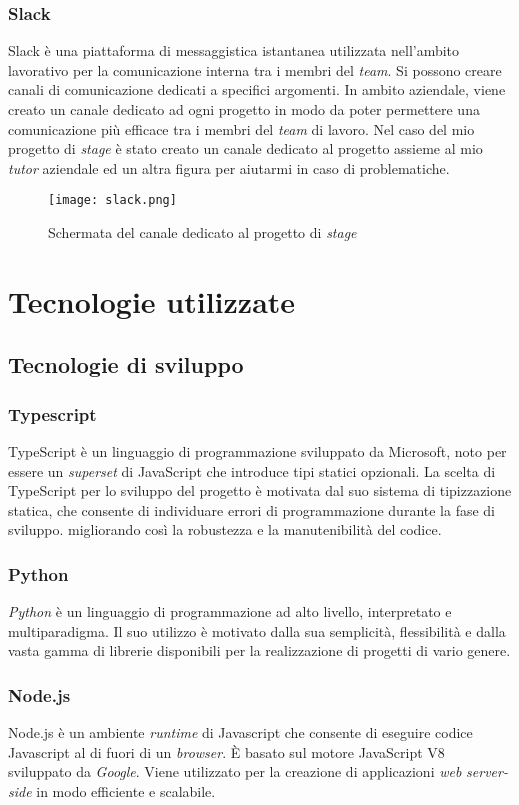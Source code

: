 \subsubsection{Slack}
Slack è una piattaforma di messaggistica istantanea utilizzata nell'ambito lavorativo per la comunicazione interna tra i membri del \textit{team}.
Si possono creare canali di comunicazione dedicati a specifici argomenti. In ambito aziendale, viene creato un canale dedicato ad ogni progetto in modo da poter permettere una comunicazione più efficace tra i membri del \textit{team} di lavoro.
Nel caso del mio progetto di \textit{stage} è stato creato un canale dedicato al progetto assieme al mio \textit{tutor} aziendale ed un altra figura per aiutarmi in caso di problematiche.
\begin{figure}[H]
    \centering
    \texttt{[image: slack.png]}
    \caption{Schermata del canale dedicato al progetto di \textit{stage}}
    \label{fig:Slack}
\end{figure}

\section{Tecnologie utilizzate}
\subsection{Tecnologie di sviluppo}
\subsubsection{Typescript}
TypeScript è un linguaggio di programmazione sviluppato da Microsoft, noto per essere un \textit{superset} di JavaScript che introduce tipi statici opzionali. La scelta di TypeScript per lo sviluppo del progetto è motivata dal suo sistema di tipizzazione statica, che consente di individuare errori di programmazione durante la fase di sviluppo.
migliorando così la robustezza e la manutenibilità del codice.

\subsubsection{Python}
\textit{Python} è un linguaggio di programmazione ad alto livello, interpretato e multiparadigma. Il suo utilizzo è motivato dalla sua semplicità, flessibilità e dalla vasta gamma di librerie disponibili per la realizzazione di progetti di vario genere.
\subsubsection{Node.js}
Node.js è un ambiente \textit{runtime} di Javascript che consente di eseguire codice Javascript al di fuori di un \textit{browser}. È basato sul motore JavaScript V8 sviluppato da \textit{Google}. Viene utilizzato per la creazione di applicazioni \textit{web} \textit{server-side} in modo efficiente e scalabile.
